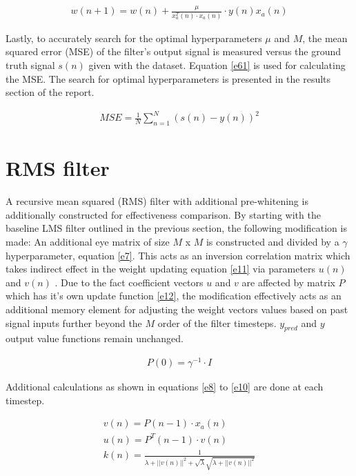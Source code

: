 \documentclass[10pt,a4paper,twocolumn]{article}
\begin{document}
\begin{eqnarray}
\label{e6}
w(n+1) = w(n) + \frac{\mu}{x_a^T(n)\cdot x_a(n)} \cdot y(n)x_a(n)
\end{eqnarray}

Lastly, to accurately search for the optimal hyperparameters $\mu$ and $M$, the mean squared error (MSE) of the filter's output signal is measured versus the ground truth signal $s(n)$ given with the dataset. Equation \ref{e61} is used for calculating the MSE. The search for optimal hyperparameters is presented in the results section of the report.




\begin{eqnarray}
\label{e61}
MSE = \frac{1}{N} \sum_{n=1}^{N}(s(n) - y(n))^2
\end{eqnarray}






\section*{RMS filter}

A recursive mean squared (RMS) filter with additional pre-whitening is additionally constructed for effectiveness comparison. By starting with the baseline LMS filter outlined in the previous section, the following modification is made: An additional eye matrix of size $M$ x $M$ is constructed and divided by a $\gamma$ hyperparameter, equation \ref{e7}. This acts as an inversion correlation matrix which takes indirect effect in the weight updating equation \ref{e11} via parameters $u(n)$ and $v(n)$ . Due to the fact coefficient vectors $u$ and $v$ are affected by matrix $P$ which has it's own update function \ref{e12}, the modification effectively acts as an additional memory element for adjusting the weight vectors values based on past signal inputs further beyond the $M$ order of the filter timesteps. $y_{pred}$ and $y$ output value functions remain unchanged.

\begin{eqnarray}
\label{e7}
P(0) = \gamma^{-1} \cdot I
\end{eqnarray}

Additional calculations as shown in equations \ref{e8} to \ref{e10} are done at each timestep. 


\begin{eqnarray}
\label{e8}
v(n) = P(n-1) \cdot x_a(n) \\
u(n) = P^T(n-1) \cdot v(n) \\
k(n) = \frac{1}{\lambda + ||v(n)||^2 + \sqrt{\lambda}\sqrt{\lambda+||v(n)||^2}}
\label{e10}
\end{eqnarray}
\end{document}
